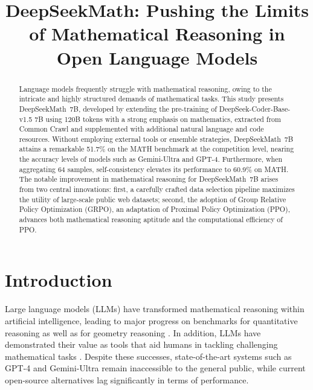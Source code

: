 \title{DeepSeekMath: Pushing the Limits of Mathematical Reasoning in Open Language Models}

\begin{abstract}
Language models frequently struggle with mathematical reasoning, owing to the intricate and highly structured demands of mathematical tasks. This study presents DeepSeekMath~7B, developed by extending the pre-training of DeepSeek-Coder-Base-v1.5 7B using 120B tokens with a strong emphasis on mathematics, extracted from Common Crawl and supplemented with additional natural language and code resources. Without employing external tools or ensemble strategies, DeepSeekMath~7B attains a remarkable 51.7\% on the MATH benchmark at the competition level, nearing the accuracy levels of models such as Gemini-Ultra and GPT-4. Furthermore, when aggregating 64 samples, self-consistency elevates its performance to 60.9\% on MATH. The notable improvement in mathematical reasoning for DeepSeekMath~7B arises from two central innovations: first, a carefully crafted data selection pipeline maximizes the utility of large-scale public web datasets; second, the adoption of Group Relative Policy Optimization (GRPO), an adaptation of Proximal Policy Optimization (PPO), advances both mathematical reasoning aptitude and the computational efficiency of PPO.
\end{abstract}

\section{Introduction}

Large language models (LLMs) have transformed mathematical reasoning within artificial intelligence, leading to major progress on benchmarks for quantitative reasoning \citep{MATH} as well as for geometry reasoning \citep{trinh2024solving}. In addition, LLMs have demonstrated their value as tools that aid humans in tackling challenging mathematical tasks \citep{tao}. Despite these successes, state-of-the-art systems such as GPT-4 \citep{gpt4} and Gemini-Ultra \citep{gemini} remain inaccessible to the general public, while current open-source alternatives lag significantly in terms of performance.

